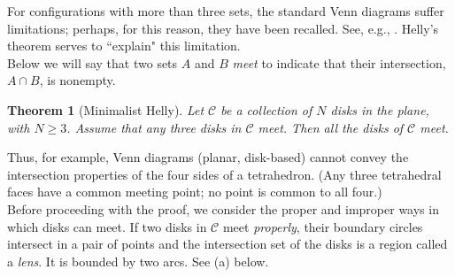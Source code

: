 \documentclass[11pt]
{amsart}
\newtheorem{theorem}{Theorem}
\begin{document}
For configurations with more than three sets,  the standard Venn diagrams suffer limitations; perhaps, for this reason, they have been recalled. See, e.g., \cite[Exercise 4, p. 44]{velleman}. Helly's theorem serves to ``explain" this limitation. \\ 


Below we will say that two sets $A$ and $B$ \emph{meet} to indicate that their intersection, $A \cap B$, is nonempty.

\begin{theorem}[Minimalist Helly] Let  $\mathcal  C$  be  a collection of $N$ disks  in the plane, with $N \ge 3$. Assume that any \emph{three} disks in $\mathcal  C$  meet. Then all the disks of $\mathcal  C$  meet.
\end{theorem}


\begin{figure}
  \vspace{-22pt}
\end{figure}
Thus, for example, Venn diagrams (planar, disk-based) cannot convey the intersection properties of the four sides of a tetrahedron. (Any three tetrahedral faces have a common meeting point; no point is common to all four.)
\\


Before proceeding with the proof, we consider the proper and improper ways in which disks can meet. If two disks in $\mathcal C$ meet \emph{properly}, their boundary circles intersect in a pair of points and the  intersection set of the disks is a region called a \emph{lens}. It is bounded by two arcs. See (a) below.
\end{document}
